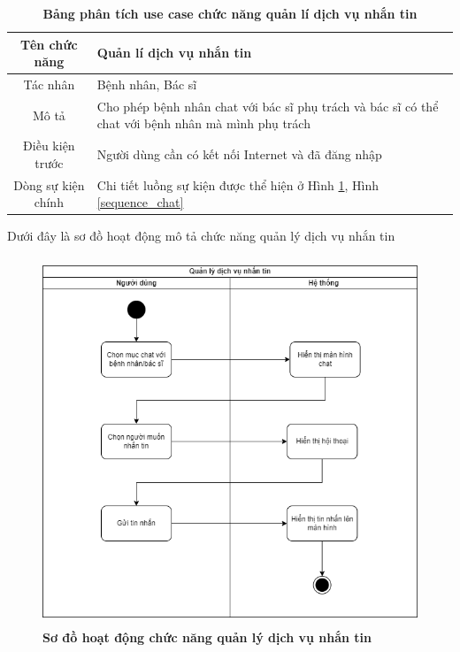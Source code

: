   \begin{table}[H]
    \caption{\bfseries \fontsize{12pt}{0pt}\selectfont Bảng phân tích use case chức năng quản lí dịch vụ nhắn tin}
    \centering
    \begin{tabularx}{0.9\textwidth}{|c|X|}
      \hline
      \textbf{Tên chức năng} & \textbf{Quản lí dịch vụ nhắn tin} \\
      \hline
      Tác nhân & Bệnh nhân, Bác sĩ \\
      \hline
      Mô tả & Cho phép bệnh nhân chat với bác sĩ phụ trách và bác sĩ có thể chat với bệnh nhân mà mình phụ trách \\
      \hline
      Điều kiện trước & Người dùng cần có kết nối Internet và đã đăng nhập \\
      \hline
      Dòng sự kiện chính & 
        Chi tiết luồng sự kiện được thể hiện ở Hình \ref{activity_chat}, Hình \ref{sequence_chat} 
        \\
      \hline
    \end{tabularx}
  \end{table}
  Dưới đây là sơ đồ hoạt động mô tả chức năng quản lý dịch vụ nhắn tin
  \begin{figure}[H]
    \centering
    \includegraphics[width=11.5cm,height=11cm]{Images/acitivity/activity_chat.png}
    \caption[Sơ đồ hoạt động chức năng quản lý dịch vụ nhắn tin]{\bfseries \fontsize{12pt}{0pt}
    \selectfont Sơ đồ hoạt động chức năng quản lý dịch vụ nhắn tin}
    \label{activity_chat} %
  \end{figure}

